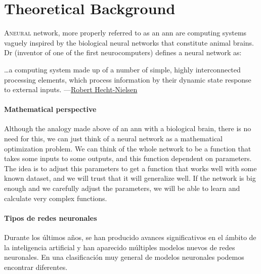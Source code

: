 

\chapter{Theoretical Background} \label{cha:theory}



\lettrine{A}{neural} network, more properly referred to as an \gls{ann} are
computing systems vaguely inspired by the biological neural networks that
constitute animal brains. Dr
 (inventor of one of the first neurocomputers) defines a neural
network as:

\begin{quoteBox}
  \ldots a computing system made up of a number of simple, highly interconnected
  processing elements, which process information by their dynamic state response
  to external inputs.
  \tcblower
  ---\href{https://en.wikipedia.org/wiki/Robert_Hecht-Nielsen}
  {Robert Hecht-Nielsen}
\end{quoteBox}

\subsubsection{Mathematical perspective}
Although the analogy made above of an \gls{ann} with a biological brain, there
is no need for this, we can just think of a neural network as a mathematical
optimization problem. We can think of the whole network to be a function that
takes some inputs to some outputs, and this function dependent on
parameters. The idea is to adjust this parameters to get a function that works
well with some known dataset, and we will trust that it will generalize
well. If the network is big enough and we carefully adjust the parameters, we
will be able to learn and calculate very complex functions.

\subsubsection{Tipos de redes neuronales}
Durante los últimos años, se han producido avances significativos en el ámbito
de la inteligencia artificial y han aparecido múltiples modelos nuevos de redes
neuronales. En una clasificación muy general de modelos neuronales podemos
encontrar diferentes.

